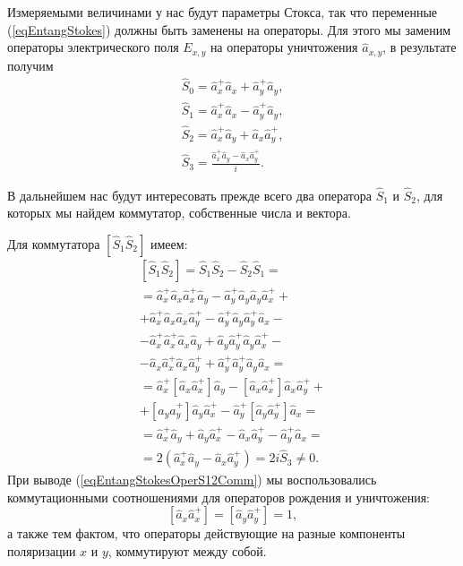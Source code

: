 Измеряемыми величинами у нас будут параметры Стокса, так что переменные
(\ref{eqEntangStokes}) должны быть заменены на операторы. Для этого мы
заменим операторы электрического поля $E_{x,y}$ на операторы
уничтожения $\hat{a}_{x,y}$, в результате получим
\begin{eqnarray}
\hat{S}_0 = \hat{a}_x^{+} \hat{a}_x + \hat{a}_y^{+} \hat{a}_y,
\nonumber \\
\hat{S}_1 = \hat{a}_x^{+} \hat{a}_x - \hat{a}_y^{+} \hat{a}_y,
\nonumber \\
\hat{S}_2 = \hat{a}_x^{+} \hat{a}_y + \hat{a}_x \hat{a}_y^{+},
\nonumber \\
\hat{S}_3 = \frac{\hat{a}_x^{+} \hat{a}_y - \hat{a}_x \hat{a}_y^{+}}{i}.
\label{eqEntangStokesOper}
\end{eqnarray}

В дальнейшем нас будут интересовать прежде всего два оператора
$\hat{S}_1$ и $\hat{S}_2$, для которых мы найдем коммутатор,
собственные числа и вектора.

Для коммутатора $\left[\hat{S}_1\hat{S}_2\right]$ имеем:
\begin{eqnarray}
\left[\hat{S}_1\hat{S}_2\right] = \hat{S}_1\hat{S}_2 -
\hat{S}_2\hat{S}_1 = 
\nonumber \\
=
\hat{a}_x^{+}\hat{a}_x\hat{a}_x^{+}\hat{a}_y -
\hat{a}_y^{+}\hat{a}_y\hat{a}_y\hat{a}_x^{+} + 
\nonumber \\
+ \hat{a}_x^{+}\hat{a}_x\hat{a}_x\hat{a}_y^{+} -
\hat{a}_y^{+}\hat{a}_y\hat{a}_y^{+}\hat{a}_x -
\nonumber \\
- \hat{a}_x^{+}\hat{a}_x^{+}\hat{a}_x\hat{a}_y +
\hat{a}_y\hat{a}_y^{+}\hat{a}_y\hat{a}_x^{+} -
\nonumber \\
- \hat{a}_x\hat{a}_x^{+}\hat{a}_x\hat{a}_y^{+} +
\hat{a}_y^{+}\hat{a}_y^{+}\hat{a}_y\hat{a}_x =
\nonumber \\
= \hat{a}_x^{+}\left[\hat{a}_x\hat{a}_x^{+}\right]\hat{a}_y -
\left[\hat{a}_x\hat{a}_x^{+}\right]\hat{a}_x\hat{a}_y^{+} +
\nonumber \\
+\left[\hat{a}_y\hat{a}_y^{+}\right]\hat{a}_y\hat{a}_x^{+} -
\hat{a}_y^{+}\left[\hat{a}_y\hat{a}_y^{+}\right]\hat{a}_x =
\nonumber \\
= \hat{a}_x^{+}\hat{a}_y + \hat{a}_y\hat{a}_x^{+} -
\hat{a}_x\hat{a}_y^{+} - \hat{a}_y^{+}\hat{a}_x = 
\nonumber \\
= 2 \left(\hat{a}_x^{+}\hat{a}_y - \hat{a}_x\hat{a}_y^{+}\right) = 2 i
\hat{S}_3 \ne 0.
\label{eqEntangStokesOperS12Comm}
\end{eqnarray}
При выводе (\ref{eqEntangStokesOperS12Comm}) мы воспользовались
коммутационными соотношениями для операторов рождения и уничтожения:
\begin{equation}
\left[\hat{a}_x \hat{a}^{+}_x\right] = \left[\hat{a}_y \hat{a}^{+}_y\right] = 1,
\nonumber
\end{equation}
а также тем фактом, что операторы действующие на разные компоненты
поляризации $x$ и $y$, коммутируют между собой.

